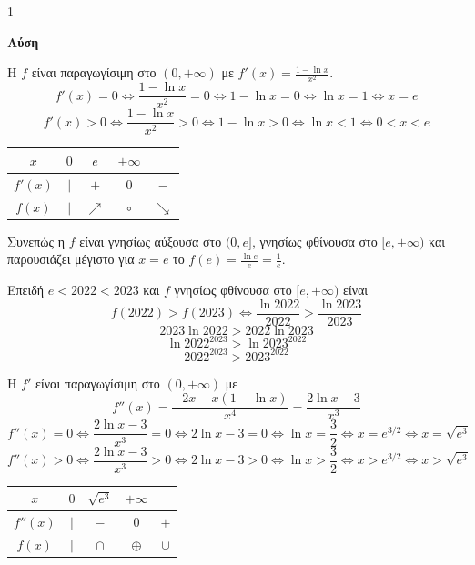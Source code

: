 \begin{ylh}{1}
    \item [Συναρτήσεις - Μελέτη Συνάρτησης]
\end{ylh}

\noindent\textbf{Λύση}

\begin{alist}
    \item [α)] Η $f$ είναι παραγωγίσιμη στο $(0,+\infty)$ με $f'(x) = \frac{1-\ln x}{x^2}$.
    \[ f'(x)=0 \iff \frac{1-\ln x}{x^2}=0 \iff 1-\ln x=0 \iff \ln x=1 \iff x=e \]
    \[ f'(x)>0 \iff \frac{1-\ln x}{x^2}>0 \iff 1-\ln x>0 \iff \ln x<1 \iff 0<x<e \]

    \begin{center}
    \begin{tabular}{|c|c||c|c|c|}
        \hline
        $x$ & $0$ & $e$ & $+\infty$ \\
        \hline\hline
        $f'(x)$ & $|$ & $+$ & $0$ & $-$ \\
        \hline
        $f(x)$ & $|$ & $\nearrow$ & $\circ$ & $\searrow$ \\
        \hline
    \end{tabular}
    \end{center}

    Συνεπώς η $f$ είναι γνησίως αύξουσα στο $(0,e]$, γνησίως φθίνουσα στο $[e,+\infty)$ και παρουσιάζει μέγιστο για $x=e$ το $f(e)= \frac{\ln e}{e} = \frac{1}{e}$.

    \item [β)] Επειδή $e<2022<2023$ και $f$ γνησίως φθίνουσα στο $[e,+\infty)$ είναι
    \[ f(2022)>f(2023) \iff \frac{\ln 2022}{2022} > \frac{\ln 2023}{2023} \]
    \[ 2023 \ln 2022 > 2022 \ln 2023 \]
    \[ \ln 2022^{2023} > \ln 2023^{2022} \]
    \[ 2022^{2023} > 2023^{2022} \]

    \item [γ)] Η $f'$ είναι παραγωγίσιμη στο $(0,+\infty)$ με
    \[ f''(x) = \frac{-2x-x(1-\ln x)}{x^4} = \frac{2\ln x -3}{x^3} \]
    \[ f''(x)=0 \iff \frac{2\ln x-3}{x^3}=0 \iff 2\ln x-3=0 \iff \ln x=\frac{3}{2} \iff x=e^{3/2} \iff x=\sqrt{e^3} \]
    \[ f''(x)>0 \iff \frac{2\ln x-3}{x^3}>0 \iff 2\ln x-3>0 \iff \ln x>\frac{3}{2} \iff x>e^{3/2} \iff x>\sqrt{e^3} \]

    \begin{center}
    \begin{tabular}{|c|c||c|c|c|}
        \hline
        $x$ & $0$ & $\sqrt{e^3}$ & $+\infty$ \\
        \hline\hline
        $f''(x)$ & $|$ & $-$ & $0$ & $+$ \\
        \hline
        $f(x)$ & $|$ & $\cap$ & $\oplus$ & $\cup$ \\
        \hline
    \end{tabular}
    \end{center}


\end{alist}
